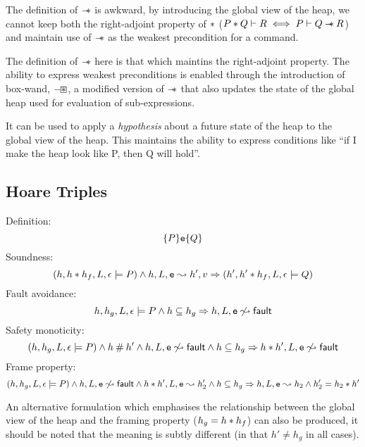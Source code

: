 \documentclass[a4paper]{article}
\begin{document}
The definition of $\mathbin{-\mkern-6mu *}$ is awkward, by introducing the global view of the
heap, we cannot keep both the right-adjoint property of $\mathbin{*}$
($P \mathbin{*} Q \vdash R \iff P \vdash Q \mathbin{-\mkern-6mu *} R$)
and maintain use of $\mathbin{-\mkern-6mu *}$ as the weakest precondition for a command.

The definition of $\mathbin{-\mkern-6mu *}$ here is that which maintins the right-adjoint property. The
ability to express weakest preconditions is enabled through the introduction
of box-wand, $\mathbin{-\mkern-3mu \boxast}$, a modified version of $\mathbin{-\mkern-6mu *}$ that also updates the
state of the global heap used for evaluation of sub-expressions.

It can be used to apply
a \emph{hypothesis} about a future state of the heap to the global view of the
heap. This maintains the ability to express conditions like ``if I make
the heap look like P, then Q will hold''.

\subsection{Hoare Triples}
Definition:
\[ \{P\}\mbox{\texttt{{\upshape e}}}\{Q\} \]
Soundness:
\[ (h, h \mathbin{*} h_f, L, \epsilon \models P) \land h, L, \mbox{\texttt{{\upshape e}}} \leadsto h', v
  \Rightarrow (h', h' \mathbin{*} h_f, L, \epsilon \models Q) \]
Fault avoidance:
\[ h, h_g, L, \epsilon \models P \land h\subseteq h_g \Rightarrow h, L, \mbox{\texttt{{\upshape e}}} \not\leadsto {\ensuremath{\mathsf{fault}}} \]
Safety monoticity:
\[ (h, h_g, L, \epsilon \models P) \land h \mathbin{\#} h' \land h, L, \mbox{\texttt{{\upshape e}}} \not\leadsto
  {\ensuremath{\mathsf{fault}}} \land h\subseteq h_g \Rightarrow h \mathbin{*} h', L, \mbox{\texttt{{\upshape e}}} \not\leadsto {\ensuremath{\mathsf{fault}}} \]
Frame property:
\[ (h, h_g, L, \epsilon \models P) \land h, L, \mbox{\texttt{{\upshape e}}} \not\leadsto {\ensuremath{\mathsf{fault}}} \land
  h \mathbin{*} h', L, \mbox{\texttt{{\upshape e}}} \leadsto h_2' \land h\subseteq h_g\Rightarrow h, L, \mbox{\texttt{{\upshape e}}} \leadsto h_2 \land
  h_2' = h_2 \mathbin{*} h' \]

An alternative formulation which emphasises the relationship between the global
view of the heap and the framing property ($h_g = h \mathbin{*} h_f$) can also be
produced, it should be noted that the meaning is subtly different (in that $h'
\neq h_g$ in all cases).
\end{document}
